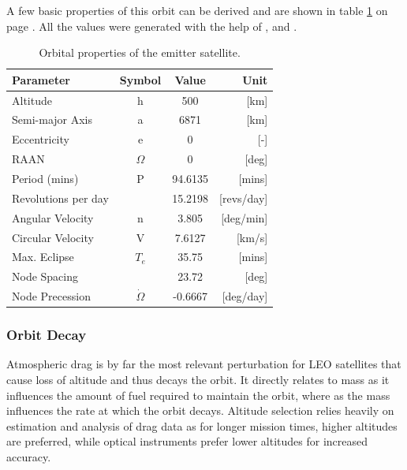 A few basic properties of this orbit can be derived and are shown in table \ref{table:orb1ref} on page \pageref{table:orb1ref}. All the values were generated with the help of \cite{larson}, \cite{spacedesign} and \cite{constDesign}.

\begin{table}[!h]
\begin{centering}
\begin{tabular}{lccr}
\toprule
Parameter				&			Symbol			&			Value			&			Unit \\
\hline \hline
Altitude				&			h						&			500				&			[km]	 \\
Semi-major Axis	&			a						&			6871			&			[km]	 \\
Eccentricity		&			e						&			0				  &			[-]	 \\
\acs{RAAN}			&			$\Omega$		&			0				&			[deg]	 \\
Period (mins)		&			P						&			94.6135	&			[mins]	 \\
Revolutions per day		&									&			15.2198	&			[revs/day]	 \\
Angular Velocity		&			n						&			3.805	&			[deg/min]	 \\
Circular Velocity		&			V						&			7.6127	&			[km/s]	 \\
Max. Eclipse		&			 	$T_e$					&			35.75	&			[mins]	 \\
Node Spacing	&			 						&			23.72	&			[deg]	 \\
Node Precession	&			 $\dot{\Omega}$					&			-0.6667	&			[deg/day]	 \\
\bottomrule
\end{tabular}
\caption{Orbital properties of the emitter satellite.}
\label{table:orb1ref}
\end{centering}
\end{table}
\subsubsection{Orbit Decay}
\label{frEmOD}
Atmospheric drag is by far the most relevant perturbation for \ac{LEO} satellites that cause loss of altitude and thus decays the orbit. It directly relates to mass as it influences the amount of fuel required to maintain the orbit, where as the mass influences the rate at which the orbit decays. Altitude selection relies heavily on estimation and analysis of drag data as for longer mission times, higher altitudes are preferred, while optical instruments prefer lower altitudes for increased accuracy.


